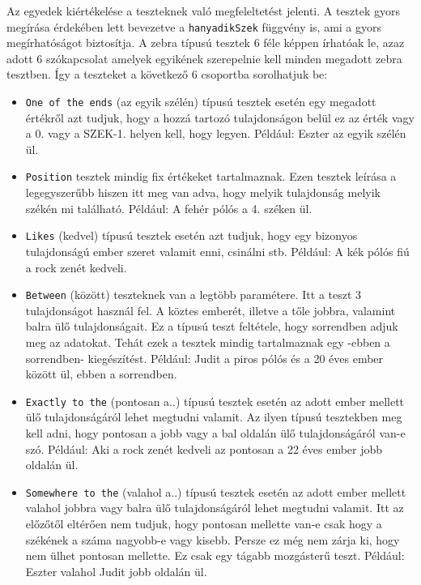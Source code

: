 \documentclass[12pt,a4paper,oneside]{report}
\begin{document}
	Az egyedek kiértékelése a teszteknek való megfeleltetést jelenti.
	A tesztek gyors megírása érdekében lett bevezetve a \texttt{hanyadikSzek} függvény is, ami a gyors megírhatóságot biztosítja.
	A zebra típusú tesztek 6 féle képpen írhatóak le, azaz adott 6 szókapcsolat amelyek egyikének szerepelnie kell minden megadott zebra tesztben.
	Így a teszteket a következő 6 csoportba sorolhatjuk be:
	\begin{itemize}
		\item \texttt{One of the ends} (az egyik szélén) típusú tesztek esetén egy megadott értékről azt tudjuk, hogy a hozzá tartozó tulajdonságon belül ez az érték vagy a 0. vagy a SZEK-1. helyen kell, hogy legyen.
		Például: Eszter az egyik szélén ül.
		\item \texttt{Position} tesztek mindig fix értékeket tartalmaznak.
		Ezen tesztek leírása a legegyszerűbb hiszen itt meg van adva, hogy melyik tulajdonság melyik székén mi található.
		Például: A fehér pólós a 4. széken ül.
		\item \texttt{Likes} (kedvel) típusú tesztek esetén azt tudjuk, hogy egy bizonyos tulajdonságú ember szeret valamit enni, csinálni stb.
		Például: A kék pólós fiú a rock zenét kedveli.
		\item \texttt{Between} (között) teszteknek van a legtöbb paramétere.
		Itt a teszt 3 tulajdonságot használ fel. A köztes emberét, illetve a tőle jobbra, valamint balra ülő tulajdonságait.
		Ez a típusú teszt feltétele, hogy sorrendben adjuk meg az adatokat.
		Tehát ezek a tesztek mindig tartalmaznak egy -ebben a sorrendben- kiegészítést.
		Például: Judit a piros pólós és a 20 éves ember között ül, ebben a sorrendben.
		\item  \texttt{Exactly to the} (pontosan a..) típusú tesztek esetén az adott ember mellett ülő tulajdonságáról lehet megtudni valamit.
		Az ilyen típusú tesztekben meg kell adni, hogy pontosan a jobb vagy a bal oldalán ülő tulajdonságáról van-e szó.
		Például: Aki a rock zenét kedveli az pontosan a 22 éves ember jobb oldalán ül.
		\item  \texttt{Somewhere to the} (valahol a..) típusú tesztek esetén az adott ember mellett valahol jobbra vagy balra ülő tulajdonságáról lehet megtudni valamit.
		Itt az előzőtől eltérően nem tudjuk, hogy pontosan mellette van-e csak hogy a székének a száma nagyobb-e vagy kisebb.
		Persze ez még nem zárja ki, hogy nem ülhet pontosan mellette.
		Ez csak egy tágabb mozgásterű teszt.
		Például: Eszter valahol Judit jobb oldalán ül.
	\end{itemize}
	
\end{document}
